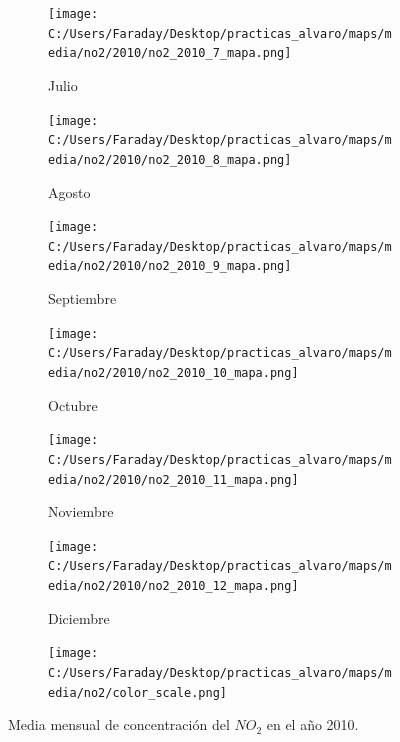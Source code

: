 \documentclass[12pt]{article}
\begin{document}
\begin{figure}[H]
\begin{subfigure}[H]{0.15\textwidth}
\texttt{[image: C:/Users/Faraday/Desktop/practicas\_alvaro/maps/media/no2/2010/no2\_2010\_7\_mapa.png]}
\captionsetup{labelformat=empty}
\caption{Julio}
\label{fig:map-no2-2010-7}
\end{subfigure}
%
\begin{subfigure}[H]{0.15\textwidth}
\texttt{[image: C:/Users/Faraday/Desktop/practicas\_alvaro/maps/media/no2/2010/no2\_2010\_8\_mapa.png]}
\captionsetup{labelformat=empty}
\caption{Agosto}
\label{fig:map-no2-2010-8}
\end{subfigure}
%
\begin{subfigure}[H]{0.15\textwidth}
\texttt{[image: C:/Users/Faraday/Desktop/practicas\_alvaro/maps/media/no2/2010/no2\_2010\_9\_mapa.png]}
\captionsetup{labelformat=empty}
\caption{Septiembre}
\label{fig:map-no2-2010-9}
\end{subfigure}
%
\begin{subfigure}[H]{0.15\textwidth}
\texttt{[image: C:/Users/Faraday/Desktop/practicas\_alvaro/maps/media/no2/2010/no2\_2010\_10\_mapa.png]}
\captionsetup{labelformat=empty}
\caption{Octubre}
\label{fig:map-no2-2010-10}
\end{subfigure}
%
\begin{subfigure}[H]{0.15\textwidth}
\texttt{[image: C:/Users/Faraday/Desktop/practicas\_alvaro/maps/media/no2/2010/no2\_2010\_11\_mapa.png]}
\captionsetup{labelformat=empty}
\caption{Noviembre}
\label{fig:map-no2-2010-11}
\end{subfigure}
%
\begin{subfigure}[H]{0.15\textwidth}
\texttt{[image: C:/Users/Faraday/Desktop/practicas\_alvaro/maps/media/no2/2010/no2\_2010\_12\_mapa.png]}
\captionsetup{labelformat=empty}
\caption{Diciembre}
\label{fig:map-no2-2010-12}
\end{subfigure}

\begin{subfigure}[H]{0.45\textwidth}
\texttt{[image: C:/Users/Faraday/Desktop/practicas\_alvaro/maps/media/no2/color\_scale.png]}
\captionsetup{labelformat=empty}
\caption{}
\end{subfigure}

\vspace*{-7mm}
\caption{Media mensual de concentración del $NO_{2}$ en el año 2010.}
\label{fig:map-no2-2010}
\end{figure}
\end{document}
